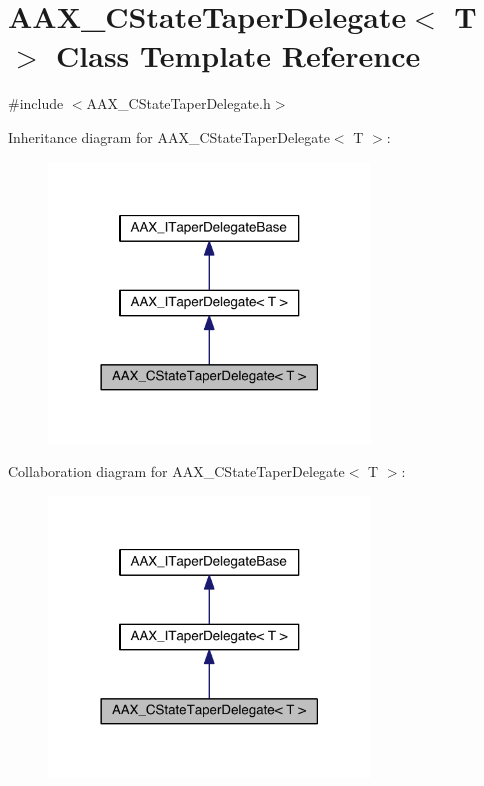 \hypertarget{a00041}{}\section{A\+A\+X\+\_\+\+C\+State\+Taper\+Delegate$<$ T $>$ Class Template Reference}
\label{a00041}


{\ttfamily \#include $<$A\+A\+X\+\_\+\+C\+State\+Taper\+Delegate.\+h$>$}



Inheritance diagram for A\+A\+X\+\_\+\+C\+State\+Taper\+Delegate$<$ T $>$\+:
\nopagebreak
\begin{figure}[H]
\begin{center}
\leavevmode
\includegraphics[width=242pt]{a00470}
\end{center}
\end{figure}


Collaboration diagram for A\+A\+X\+\_\+\+C\+State\+Taper\+Delegate$<$ T $>$\+:
\nopagebreak
\begin{figure}[H]
\begin{center}
\leavevmode
\includegraphics[width=242pt]{a00471}
\end{center}
\end{figure}


